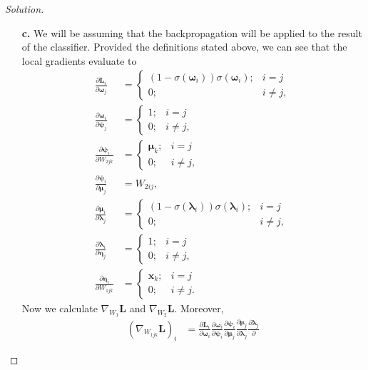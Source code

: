 \documentclass[ 12pt ]{article}
\begin{document}
\begin{enumerate}
\begin{proof}[Solution]
\begin{enumerate}
				\item[\textbf{c.}] We will be assuming that the backpropagation will be applied to the result of the classifier. Provided the definitions stated above, we can see that
					the local gradients evaluate to
					\begin{align*}
						\frac{\partial \textbf{L}_i}{\partial \pmb{\omega}_j} &= \begin{cases} (1 - \sigma(\pmb{\omega}_i))\sigma(\pmb{\omega}_i); & i = j \\ 0; & i \neq j, \end{cases} \\
						\frac{\partial \pmb{\omega}_i}{\partial \pmb{\psi}_j} &= \begin{cases} 1; & i = j \\ 0; & i \neq j, \end{cases} \\
						\frac{\partial \pmb{\psi}_i}{\partial W_{2jk}} &= \begin{cases} \pmb{\mu}_k; & i = j \\ 0; & i \neq j, \end{cases} \\
						\frac{\partial \pmb{\psi}_i}{\partial \pmb{\mu}_j} &= W_{2ij}, \\
						\frac{\partial \pmb{\mu}_i}{\partial \pmb{\lambda}_j} &= \begin{cases} (1 - \sigma(\pmb{\lambda}_i))\sigma(\pmb{\lambda}_i); & i = j \\ 0; & i \neq j, \end{cases} \\
						\frac{\partial \pmb{\lambda}_i}{\partial \pmb{\eta}_j} &= \begin{cases} 1; & i = j \\ 0; & i \neq j ,\end{cases} \\
						\frac{\partial \pmb{\eta}_i}{\partial W_{1jk}} &= \begin{cases} \textbf{x}_k; & i = j \\ 0; & i \neq j. \end{cases}
					\end{align*}
					Now we calculate $\nabla_{W_1} \textbf{L}$ and $\nabla_{W_2} \textbf{L}$. Moreover,
					\begin{align*}
						(\nabla_{W_{1jk}} \textbf{L})_i &= \frac{\partial \textbf{L}_i}{\partial \pmb{\omega}_i} \frac{\partial \pmb{\omega}_i}{\partial \pmb{\psi}_i} \frac{
						\partial \pmb{\psi}_i}{\partial \pmb{\mu}_j} \frac{\partial \pmb{\mu}_j}{\partial \pmb{\lambda}_j} \frac{\partial \pmb{\lambda}_j}{\partial
}
\end{align*}
\end{enumerate}
\end{proof}
\end{enumerate}
\end{document}
